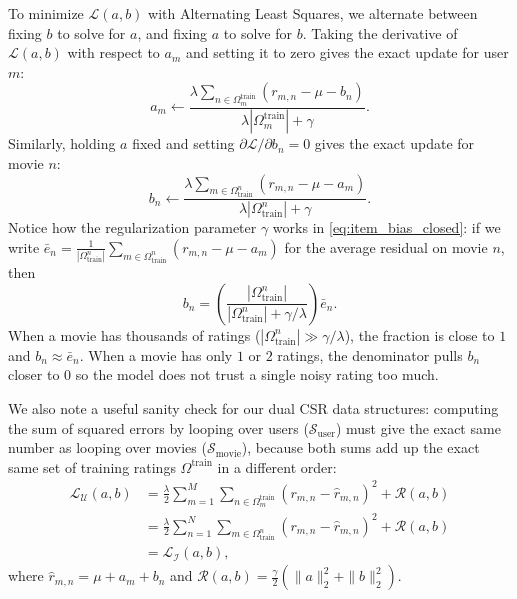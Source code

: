 \documentclass{article}
\theoremstyle{plain}
\theoremstyle{definition}
\begin{document}
To minimize $\mathcal{L}(a,b)$ with Alternating Least Squares, we alternate between fixing $b$ to solve for $a$, and fixing $a$ to solve for $b$. Taking the derivative of $\mathcal{L}(a,b)$ with respect to $a_m$ and setting it to zero gives the exact update for user $m$:
\begin{equation}
    a_m \leftarrow \frac{\lambda \sum_{n \in \Omega_m^{\text{train}}} \left(r_{m,n} - \mu - b_n\right)}{\lambda |\Omega_m^{\text{train}}| + \gamma}.
    \label{eq:user_bias_closed}
\end{equation}
Similarly, holding $a$ fixed and setting $\partial \mathcal{L} / \partial b_n = 0$ gives the exact update for movie $n$:
\begin{equation}
    b_n \leftarrow \frac{\lambda \sum_{m \in \Omega_{\text{train}}^n} \left(r_{m,n} - \mu - a_m\right)}{\lambda |\Omega_{\text{train}}^n| + \gamma}.
    \label{eq:item_bias_closed}
\end{equation}
Notice how the regularization parameter $\gamma$ works in \cref{eq:item_bias_closed}: if we write $\bar{e}_n = \frac{1}{|\Omega_{\text{train}}^n|} \sum_{m \in \Omega_{\text{train}}^n} (r_{m,n} - \mu - a_m)$ for the average residual on movie $n$, then
\begin{equation}
    b_n = \left(\frac{|\Omega_{\text{train}}^n|}{|\Omega_{\text{train}}^n| + \gamma / \lambda}\right) \bar{e}_n.
\end{equation}
When a movie has thousands of ratings ($|\Omega_{\text{train}}^n| \gg \gamma / \lambda$), the fraction is close to $1$ and $b_n \approx \bar{e}_n$. When a movie has only $1$ or $2$ ratings, the denominator pulls $b_n$ closer to $0$ so the model does not trust a single noisy rating too much.

We also note a useful sanity check for our dual CSR data structures: computing the sum of squared errors by looping over users ($\mathcal{S}_{\text{user}}$) must give the exact same number as looping over movies ($\mathcal{S}_{\text{movie}}$), because both sums add up the exact same set of training ratings $\Omega^{\text{train}}$ in a different order:
\begin{align}
    \mathcal{L}_{\mathcal{U}}(a,b) &= \frac{\lambda}{2} \sum_{m=1}^M \sum_{n \in \Omega_m^{\text{train}}} (r_{m,n} - \hat{r}_{m,n})^2 + \mathcal{R}(a,b) \nonumber \\
    &= \frac{\lambda}{2} \sum_{n=1}^N \sum_{m \in \Omega_{\text{train}}^n} (r_{m,n} - \hat{r}_{m,n})^2 + \mathcal{R}(a,b) \nonumber \\
    &= \mathcal{L}_{\mathcal{I}}(a,b),
    \label{eq:fubini_invariance}
\end{align}
where $\hat{r}_{m,n} = \mu + a_m + b_n$ and $\mathcal{R}(a,b) = \frac{\gamma}{2}(\|a\|_2^2 + \|b\|_2^2)$.
\end{document}
